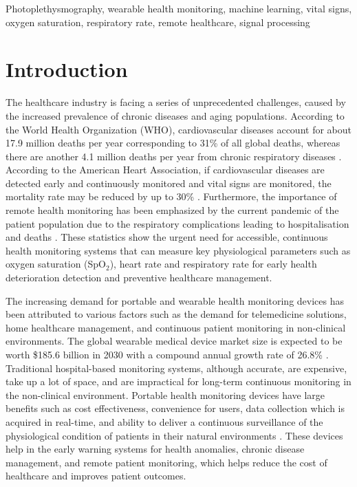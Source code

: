 \documentclass{ieeeaccess}
\begin{document}
\begin{keywords}
Photoplethysmography, wearable health monitoring, machine learning, vital signs, oxygen saturation, respiratory rate, remote healthcare, signal processing
\end{keywords}

\titlepgskip=-15pt

\maketitle

\section{Introduction}
\label{sec:introduction}

The healthcare industry is facing a series of unprecedented challenges, caused by the increased prevalence of chronic diseases and aging populations. According to the World Health Organization (WHO), cardiovascular diseases account for about 17.9 million deaths per year corresponding to 31\% of all global deaths, whereas there are another 4.1 million deaths per year from chronic respiratory diseases \cite{b1}. According to the American Heart Association, if cardiovascular diseases are detected early and continuously monitored and vital signs are monitored, the mortality rate may be reduced by up to 30\% \cite{b2}. Furthermore, the importance of remote health monitoring has been emphasized by the current pandemic of the patient population due to the respiratory complications leading to hospitalisation and deaths \cite{b3}. These statistics show the urgent need for accessible, continuous health monitoring systems that can measure key physiological parameters such as oxygen saturation (SpO$_2$), heart rate and respiratory rate for early health deterioration detection and preventive healthcare management.

The increasing demand for portable and wearable health monitoring devices has been attributed to various factors such as the demand for telemedicine solutions, home healthcare management, and continuous patient monitoring in non-clinical environments. The global wearable medical device market size is expected to be worth \$185.6 billion in 2030 with a compound annual growth rate of 26.8\% \cite{b4}. Traditional hospital-based monitoring systems, although accurate, are expensive, take up a lot of space, and are impractical for long-term continuous monitoring in the non-clinical environment. Portable health monitoring devices have large benefits such as cost effectiveness, convenience for users, data collection which is acquired in real-time, and ability to deliver a continuous surveillance of the physiological condition of patients in their natural environments \cite{b5}. These devices help in the early warning systems for health anomalies, chronic disease management, and remote patient monitoring, which helps reduce the cost of healthcare and improves patient outcomes.
\end{document}
